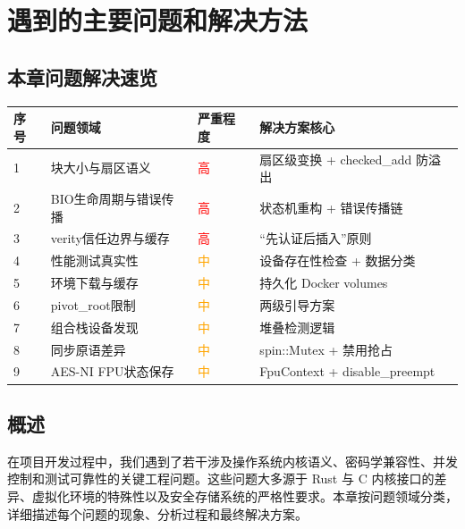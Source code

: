 \chapter{遇到的主要问题和解决方法}

\section*{本章问题解决速览}

\begin{table}[H]
    \centering
    \begin{tabular}{p{}p{}p{}p{}}
        \toprule
        \textbf{序号} & \textbf{问题领域} & \textbf{严重程度} & \textbf{解决方案核心} \\
        \midrule
        1 & 块大小与扇区语义 & \textcolor{red}{高} & 扇区级变换 + checked\_add 防溢出 \\
        2 & BIO生命周期与错误传播 & \textcolor{red}{高} & 状态机重构 + 错误传播链 \\
        3 & verity信任边界与缓存 & \textcolor{red}{高} & “先认证后插入”原则 \\
        4 & 性能测试真实性 & \textcolor{orange}{中} & 设备存在性检查 + 数据分类 \\
        5 & 环境下载与缓存 & \textcolor{orange}{中} & 持久化 Docker volumes \\
        6 & pivot\_root限制 & \textcolor{orange}{中} & 两级引导方案 \\
        7 & 组合栈设备发现 & \textcolor{orange}{中} & 堆叠检测逻辑 \\
        8 & 同步原语差异 & \textcolor{orange}{中} & spin::Mutex + 禁用抢占 \\
        9 & AES-NI FPU状态保存 & \textcolor{orange}{中} & FpuContext + disable\_preempt \\
        \bottomrule
    \end{tabular}
\end{table}

\section{概述}

在项目开发过程中，我们遇到了若干涉及操作系统内核语义、密码学兼容性、并发控制和测试可靠性的关键工程问题。这些问题大多源于 Rust 与 C 内核接口的差异、虚拟化环境的特殊性以及安全存储系统的严格性要求。本章按问题领域分类，详细描述每个问题的现象、分析过程和最终解决方案。

